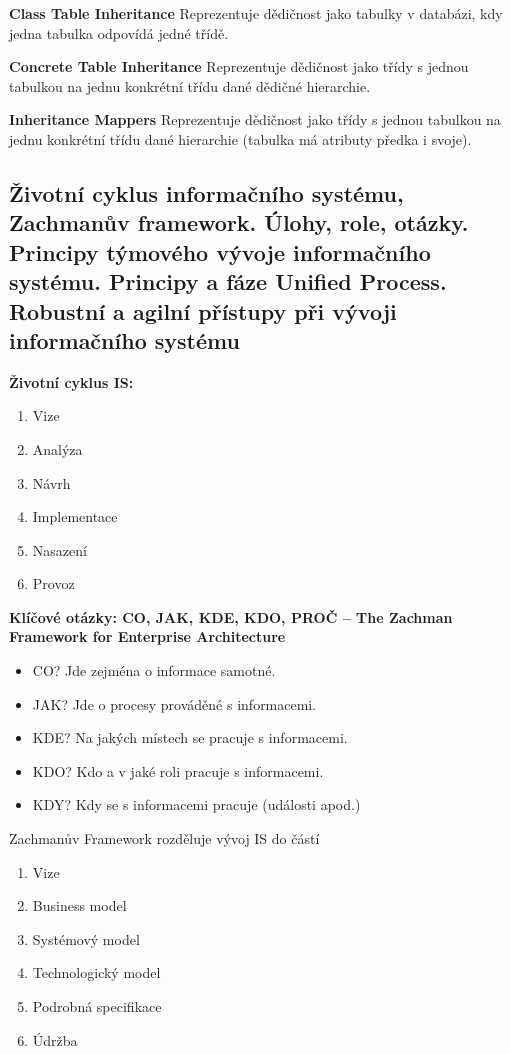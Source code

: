 \textbf{Class Table Inheritance} Reprezentuje dědičnost jako tabulky v databázi, kdy jedna tabulka odpovídá jedné třídě.

\textbf{Concrete Table Inheritance} Reprezentuje dědičnost jako třídy s jednou tabulkou na jednu konkrétní třídu dané dědičné hierarchie.

\textbf{Inheritance Mappers} Reprezentuje dědičnost jako třídy s jednou tabulkou na jednu konkrétní třídu dané hierarchie (tabulka má atributy předka i svoje).

\subsection[Životní cyklus IS, Principy vývoje, Vývoj v týmu]{Životní cyklus informačního systému, Zachmanův framework. Úlohy, role, otázky. Principy týmového vývoje informačního systému. Principy a fáze Unified Process. Robustní a agilní přístupy při vývoji informačního systému}
\textbf{Životní cyklus IS:}
\begin{enumerate}
\item Vize
\item Analýza
\item Návrh
\item Implementace
\item Nasazení
\item Provoz
\end{enumerate}

\textbf{Klíčové otázky: CO, JAK, KDE, KDO, PROČ – The Zachman Framework for Enterprise Architecture}
\begin{itemize}
\item CO? Jde zejména o informace samotné.
\item JAK? Jde o procesy prováděné s informacemi.
\item KDE? Na jakých místech se pracuje s informacemi.
\item KDO? Kdo a v jaké roli pracuje s informacemi.
\item KDY? Kdy se s informacemi pracuje (události apod.)
\end{itemize}

Zachmanův Framework rozděluje vývoj IS do částí
\begin{enumerate}
\item Vize
\item Business model
\item Systémový model
\item Technologický model
\item Podrobná specifikace
\item Údržba
\end{enumerate}


